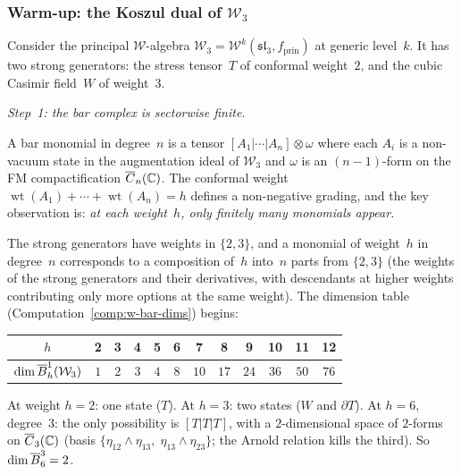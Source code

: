 \subsubsection*{Warm-up: the Koszul dual of $\mathcal{W}_3$}

Consider the principal $\mathcal{W}$-algebra
$\mathcal{W}_3 = \mathcal{W}^k(\mathfrak{sl}_3, f_{\mathrm{prin}})$
at generic level~$k$.
It has two strong generators: the stress tensor~$T$ of conformal
weight~$2$, and the cubic Casimir field~$W$ of weight~$3$.

\emph{Step~1: the bar complex is sectorwise finite.}

A bar monomial in degree~$n$ is a tensor
$[A_1|\cdots|A_n] \otimes \omega$
where each $A_i$ is a non-vacuum state in the augmentation ideal of
$\mathcal{W}_3$ and $\omega$ is an $(n{-}1)$-form on the FM
compactification $\overline{C}_n(\mathbb{C})$.  The conformal weight
$\operatorname{wt}(A_1) + \cdots + \operatorname{wt}(A_n) = h$
defines a non-negative grading, and the key observation is:
\emph{at each weight~$h$, only finitely many monomials appear.}

The strong generators have weights in $\{2,3\}$, and a monomial of
weight~$h$ in degree~$n$ corresponds to a composition of~$h$ into~$n$
parts from $\{2,3\}$ (the weights of the strong generators and their
derivatives, with descendants at higher weights contributing only more
options at the same weight).  The dimension table
(Computation~\ref{comp:w-bar-dims}) begins:
\begin{center}
\renewcommand{\arraystretch}{1.1}
\begin{tabular}{c|ccccccccccc}
$h$ & 2 & 3 & 4 & 5 & 6 & 7 & 8 & 9 & 10 & 11 & 12 \\
\hline
$\dim \overline{B}^1_h(\mathcal{W}_3)$ &
$1$ & $2$ & $3$ & $4$ & $8$ & $10$ & $17$ & $24$ & $36$ & $50$ & $76$
\end{tabular}
\end{center}
At weight $h = 2$: one state ($T$).
At $h = 3$: two states ($W$ and $\partial T$).
At $h = 6$, degree~$3$: the only possibility is $[T|T|T]$, with a
$2$-dimensional space of $2$-forms on $\overline{C}_3(\mathbb{C})$
(basis $\{\eta_{12} \wedge \eta_{13},\;\eta_{13} \wedge \eta_{23}\}$;
the Arnold relation kills the third).  So $\dim \overline{B}^3_6 = 2$.

